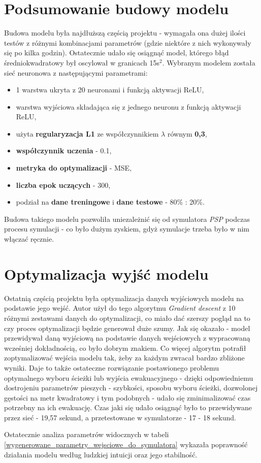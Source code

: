 \documentclass[12pt]{aghdpl}
\begin{document}
		\section{Podsumowanie budowy modelu}
		Budowa modelu była najdłuższą częścią projektu - wymagała ona dużej ilości testów z różnymi kombinacjami parametrów (gdzie niektóre z nich wykonywały się po kilka godzin). Ostatecznie udało się osiągnąć model, którego błąd średniokwadratowy był oscylował w granicach 15s$^2$. Wybranym modelem została sieć neuronowa z następującymi parametrami:
		\begin{itemize}
		\item 1 warstwa ukryta z 20 neuronami i funkcją aktywacji ReLU,
		\item warstwa wyjściowa składająca się z jednego neuronu z funkcją aktywacji ReLU,
		\item użyta \textbf{regularyzacja L1} ze współczynnikiem $\lambda$ równym \textbf{0,3},
		\item \textbf{współczynnik uczenia} - 0.1,
		\item \textbf{metryka do optymalizacji} - MSE,
		\item \textbf{liczba epok uczących} - 300,
		\item podział na \textbf{dane treningowe} i \textbf{dane testowe} - 80\% : 20\%.
		\end{itemize}
		
		Budowa takiego modelu pozwoliła uniezależnić się od symulatora \textit{PSP} podczas procesu symulacji - co było dużym zyskiem, gdyż symulacje trzeba było w nim włączać ręcznie.
		
		\section{Optymalizacja wyjść modelu}
		Ostatnią częścią projektu była optymalizacja danych wyjściowych modelu na podstawie jego wejść. Autor użył do tego algorytmu \textit{Gradient descent} z 10 różnymi zestawami danych do optymalizacji, co miało dać szerszy pogląd na to czy proces optymalizacji będzie generował duże szumy. Jak się okazało - model przewidywał daną wyjściową na podstawie danych wejściowych z wypracowaną wcześniej dokładnością, co było dobrym znakiem. Co więcej algorytm potrafił zoptymalizować wejścia modelu tak, żeby za każdym zwracał bardzo zbliżone wyniki. Daje to także ostateczne rozwiązanie postawionego problemu optymalnego wyboru ścieżki lub wyjścia ewakuacyjnego - dzięki odpowiedniemu dostrojeniu parametrów pieszych - szybkości, sposobu wyboru ścieżki, dozwolonej gęstości na metr kwadratowy i tym podobnych - udało się zminimalizować czas potrzebny na ich ewakuację. Czas jaki się udało osiągnąć było to przewidywane przez sieć - 19,57 sekund, a przetestowane w symulatorze - 17 - 18 sekund.
		
		Ostatecznie analiza parametrów widocznych w tabeli \ref{wygenerowane_parametry_wejsciowe_do_symulatora} wykazała poprawność działania modelu według ludzkiej intuicji oraz jego stabilność.
		
	\printbibliography
\end{document}
